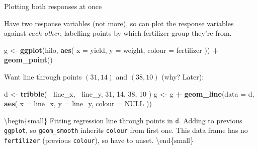 \documentclass[ignorenonframetext,]{beamer}
\newenvironment{Shaded}{\begin{snugshade}}{\end{snugshade}}
\newcommand{\DataTypeTok}[1]{\textcolor[rgb]{0.13,0.29,0.53}{#1}}
\newcommand{\DecValTok}[1]{\textcolor[rgb]{0.00,0.00,0.81}{#1}}
\newcommand{\KeywordTok}[1]{\textcolor[rgb]{0.13,0.29,0.53}{\textbf{#1}}}
\newcommand{\NormalTok}[1]{#1}
\newcommand{\OperatorTok}[1]{\textcolor[rgb]{0.81,0.36,0.00}{\textbf{#1}}}
\newcommand{\OtherTok}[1]{\textcolor[rgb]{0.56,0.35,0.01}{#1}}
\newcommand{\StringTok}[1]{\textcolor[rgb]{0.31,0.60,0.02}{#1}}
\begin{document}
\begin{frame}[fragile]{Plotting both responses at once}
\protect\hypertarget{plotting-both-responses-at-once}{}

Have two response variables (not more), so can plot the response
variables against \emph{each other}, labelling points by which
fertilizer group they're from.

\begin{Shaded}
\begin{Highlighting}[]
\NormalTok{g <-}\StringTok{ }\KeywordTok{ggplot}\NormalTok{(hilo, }\KeywordTok{aes}\NormalTok{(}
  \DataTypeTok{x =}\NormalTok{ yield, }\DataTypeTok{y =}\NormalTok{ weight,}
  \DataTypeTok{colour =}\NormalTok{ fertilizer}
\NormalTok{)) }\OperatorTok{+}\StringTok{ }\KeywordTok{geom_point}\NormalTok{()}
\end{Highlighting}
\end{Shaded}

Want line through points \((31,14)\) and \((38,10)\) (why? Later):

\begin{Shaded}
\begin{Highlighting}[]
\NormalTok{d <-}\StringTok{ }\KeywordTok{tribble}\NormalTok{(}
  \OperatorTok{~}\NormalTok{line_x, }\OperatorTok{~}\NormalTok{line_y,}
  \DecValTok{31}\NormalTok{, }\DecValTok{14}\NormalTok{,}
  \DecValTok{38}\NormalTok{, }\DecValTok{10}
\NormalTok{)}
\NormalTok{g <-}\StringTok{ }\NormalTok{g }\OperatorTok{+}\StringTok{ }\KeywordTok{geom_line}\NormalTok{(}\DataTypeTok{data =}\NormalTok{ d, }\KeywordTok{aes}\NormalTok{(}
  \DataTypeTok{x =}\NormalTok{ line_x, }\DataTypeTok{y =}\NormalTok{ line_y,}
  \DataTypeTok{colour =} \OtherTok{NULL}
\NormalTok{))}
\end{Highlighting}
\end{Shaded}

\textbackslash{}begin\{small\} Fitting regression line through points in
\texttt{d}. Adding to previous \texttt{ggplot}, so \texttt{geom\_smooth}
inherits \texttt{colour} from first one. This data frame has no
\texttt{fertilizer} (previous \texttt{colour}), so have to unset.
\textbackslash{}end\{small\}

\end{frame}
\end{document}
